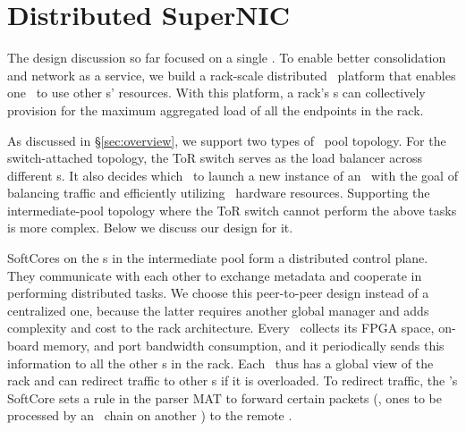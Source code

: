 \section{Distributed SuperNIC}
\label{sec:dist}

The design discussion so far focused on a single \snic. To enable better consolidation and network as a service, we 
build a rack-scale distributed \snic\ platform that enables one \snic\ to use other \snic{}s' resources.
With this platform, a rack's \snic{}s can collectively provision for the maximum aggregated load of all the endpoints in the rack.

As discussed in \S\ref{sec:overview}, we support two types of \snic\ pool topology.
For the switch-attached topology, the ToR switch serves as the load balancer across different \snic{}s.
It also decides which \snic\ to launch a new instance of an \nt\ with the goal of balancing traffic and efficiently utilizing \snic\ hardware resources.
Supporting the intermediate-pool topology where the ToR switch cannot perform the above tasks is more complex. Below we discuss our design for it.

SoftCores on the \snic{}s in the intermediate pool form a distributed control plane. 
They communicate with each other to exchange metadata and cooperate in performing distributed tasks. %
We choose this peer-to-peer design instead of a centralized one, because the latter requires another global manager and adds complexity and cost to the rack architecture. %
Every \snic\ collects its FPGA space, on-board memory, and port bandwidth consumption, and it periodically sends this information to all the other \snic{}s in the rack.
Each \snic\ thus has a global view of the rack and can redirect traffic to other \snic{}s if it is overloaded.
To redirect traffic, the \snic's SoftCore sets a rule in the parser MAT to forward certain packets (\eg, ones to be processed by an \nt\ chain on another \snic) to the remote \snic.

